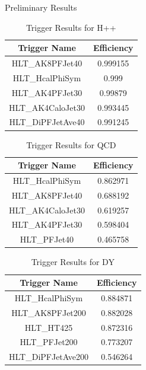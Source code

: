 \documentclass{beamer}
\newlength{\colwidth}
\begin{document}
\begin{frame}[t]
\begin{columns}[t]
\begin{column}{\colwidth}
\begin{block}{Preliminary Results}
    \begin{table}[]
      \begin{center}
           \caption{\label{table:1}Trigger Results for H++}
     \begin{tabular}[t]{c|c}
          \hline
          \textbf{Trigger Name} & \textbf{Efficiency}\\
          \hline
          HLT\_AK8PFJet40 & 0.999155\\
          HLT\_HcalPhiSym & 0.999 \\
          HLT\_AK4PFJet30 & 0.99879 \\
          HLT\_AK4CaloJet30 & 0.993445 \\
          HLT\_DiPFJetAve40  & 0.991245
      \end{tabular}
    \end{center}
    \end{table}
    \begin{table}
      \caption{\label{table:2}Trigger Results for QCD}
          \begin{tabular}[t]{c|c}
              \hline
              \textbf{Trigger Name} & \textbf{Efficiency}\\
              \hline
              HLT\_HcalPhiSym & 0.862971\\
              HLT\_AK8PFJet40 & 0.688192 \\
              HLT\_AK4CaloJet30 & 0.619257 \\
              HLT\_AK4PFJet30 & 0.598404 \\
              HLT\_PFJet40 & 0.465758
          \end{tabular}
  \end{table}

  \begin{table}[h!]
    \caption{\label{table:3}Trigger Results for DY}
        \begin{tabular}[t]{c|c}
            \hline
            \textbf{Trigger Name} & \textbf{Efficiency}\\
            \hline
            HLT\_HcalPhiSym & 0.884871\\
            HLT\_AK8PFJet200 & 0.882028 \\
            HLT\_HT425 & 0.872316 \\
            HLT\_PFJet200 & 0.773207 \\
            HLT\_DiPFJetAve200 & 0.546264
        \end{tabular}
\end{table}
    


\end{block}
\end{column}
\end{columns}
\end{frame}
\end{document}
